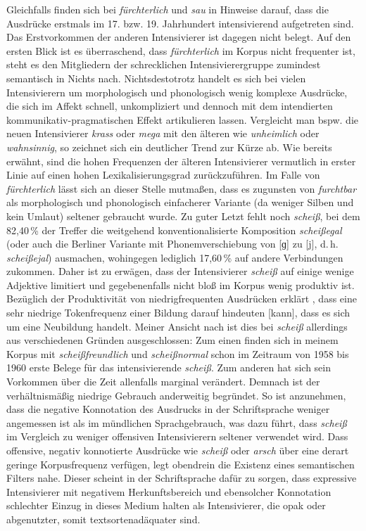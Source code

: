 Gleichfalls finden sich bei \textit{fürchterlich} und \textit{sau} in \mbox{\citet[386, 1168]{Pfeifer.1995}} Hinweise darauf, dass die Ausdrücke erstmals im 17. bzw. 19. Jahrhundert intensivierend aufgetreten sind. Das Erstvorkommen der anderen Intensivierer ist dagegen nicht belegt. Auf den ersten Blick ist es überraschend, dass \textit{fürchterlich} im Korpus nicht frequenter ist, steht es den Mitgliedern der \glqq{}schrecklichen\grqq{} Intensivierergruppe zumindest semantisch in Nichts nach. Nichtsdestotrotz handelt es sich bei vielen Intensivierern um morphologisch und phonologisch wenig komplexe Ausdrücke, die sich im Affekt schnell, unkompliziert und dennoch mit dem intendierten kommunikativ-pragmatischen Effekt artikulieren lassen. Vergleicht man bspw. die neuen Intensivierer \textit{krass} oder \textit{mega} mit den älteren wie \textit{unheimlich} oder \textit{wahnsinnig}, so zeichnet sich ein deutlicher Trend zur Kürze ab. Wie bereits erwähnt, sind die hohen Frequenzen der älteren Intensivierer vermutlich in erster Linie auf einen hohen Lexikalisierungsgrad zurückzuführen. Im Falle von \textit{fürchterlich} lässt sich an dieser Stelle mutmaßen, dass es zugunsten von \textit{furchtbar} als morphologisch und phonologisch einfacherer Variante (da weniger Silben und kein Umlaut) seltener gebraucht wurde. Zu guter Letzt fehlt noch \textit{scheiß}, bei dem 82,40\,\% der Treffer die weitgehend konventionalisierte Komposition \textit{scheißegal} (oder auch die Berliner Variante mit Phonemverschiebung von [ɡ] zu [j], d.\,h. \textit{scheißejal}) ausmachen, wohingegen lediglich 17,60\,\% auf andere Verbindungen zukommen. Daher ist zu erwägen, dass der Intensivierer \textit{scheiß} auf einige wenige Adjektive limitiert und gegebenenfalls nicht bloß im Korpus wenig produktiv ist. Bezüglich der Produktivität von niedrigfrequenten Ausdrücken erklärt \citet[72]{Kempf.2016}, dass eine \glqq{}sehr niedrige Tokenfrequenz einer Bildung darauf hindeuten [kann], dass es sich um eine Neubildung handelt.\grqq{} Meiner Ansicht nach ist dies bei \textit{scheiß} allerdings aus verschiedenen Gründen ausgeschlossen: Zum einen finden sich in meinem Korpus mit \textit{scheißfreundlich} und \textit{scheißnormal} schon im Zeitraum von 1958 bis 1960 erste Belege für das intensivierende \textit{scheiß}. Zum anderen hat sich sein Vorkommen über die Zeit allenfalls marginal verändert. Demnach ist der verhältnismäßig niedrige Gebrauch anderweitig begründet. So ist anzunehmen, dass die negative Konnotation des Ausdrucks in der Schriftsprache weniger angemessen ist als im mündlichen Sprachgebrauch, was dazu führt, dass \textit{scheiß} im Vergleich zu weniger offensiven Intensivierern seltener verwendet wird. Dass offensive, negativ konnotierte Ausdrücke wie \textit{scheiß} oder \textit{arsch} über eine derart geringe Korpusfrequenz verfügen, legt obendrein die Existenz eines semantischen Filters nahe. Dieser scheint in der Schriftsprache dafür zu sorgen, dass expressive Intensivierer mit negativem Herkunftsbereich und ebensolcher Konnotation schlechter Einzug in dieses Medium halten als Intensivierer, die opak oder abgenutzter, somit textsortenadäquater sind.

